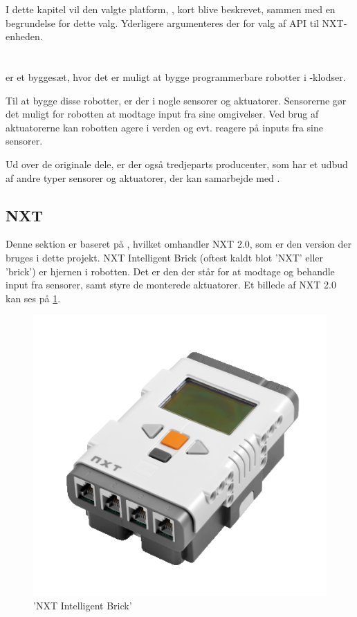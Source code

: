 I dette kapitel vil den valgte platform, \legoms, kort blive beskrevet, sammen med en begrundelse for dette valg.
Yderligere argumenteres der for valg af API til NXT-enheden.

\section{\legoms}\label{lego:mindstorms-nxt}
\legoms er et byggesæt, hvor det er muligt at bygge programmerbare robotter i \lego-klodser.

Til at bygge disse robotter, er der i \legoms nogle sensorer og aktuatorer. Sensorerne gør det muligt for robotten at modtage input fra sine omgivelser.
Ved brug af aktuatorerne kan robotten agere i verden og evt. reagere på inputs fra sine sensorer.

Ud over de originale \lego dele, er der også tredjeparts producenter, som har et udbud af andre typer sensorer og aktuatorer, der kan samarbejde med \legoms.

\subsection{NXT}
Denne sektion er baseret på \cite{nxt}, hvilket omhandler NXT 2.0, som er den version der bruges i dette projekt.
NXT Intelligent Brick (oftest kaldt blot 'NXT' eller 'brick') er hjernen i \legoms robotten.
Det er den der står for at modtage og behandle input fra sensorer, samt styre de monterede aktuatorer.
Et billede af NXT 2.0 kan ses på \cref{platform:nxt}.

\begin{figure}
\begin{center}
\includegraphics[scale=.5]{./graphics/nxt/brick}
\end{center}
\caption{'NXT Intelligent Brick'}
\label{platform:nxt}
\end{figure}

